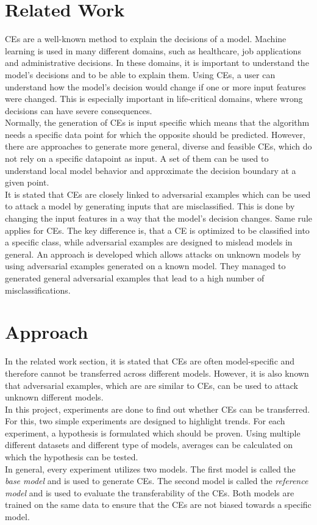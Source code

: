 \documentclass{article}
\begin{document}
\section{Related Work}
CEs are a well-known method to explain the decisions of a model. Machine learning is used in many different domains, such as healthcare, job applications and administrative decisions. In these domains, it is important to understand the model's decisions and to be able to explain them. Using CEs, a user can understand how the model's decision would change if one or more input features were changed. This is especially important in life-critical domains, where wrong decisions can have severe consequences. \cite{examples_cf_applications}\\
Normally, the generation of CEs is input specific which means that the algorithm needs a specific data point for which the opposite should be predicted. However, there are approaches to generate more general, diverse and feasible CEs, which do not rely on a specific datapoint as input. A set of them can be used to understand local model behavior and approximate the decision boundary at a given point. \cite{examples_cf_applications} \\
It is stated that CEs are closely linked to adversarial examples which can be used to attack a model by generating inputs that are misclassified. This is done by changing the input features in a way that the model's decision changes. Same rule applies for CEs. The key difference is, that a CE is optimized to be classified into a specific class, while adversarial examples are designed to mislead models in general. An approach is developed which allows attacks on unknown models by using adversarial examples generated on a known model. They managed to generated general adversarial examples that lead to a high number of misclassifications. \cite{papernot2016transferabilitymachinelearningphenomena} \\

\section{Approach}
In the related work section, it is stated that CEs are often model-specific and therefore cannot be transferred across different models. However, it is also known that adversarial examples, which are are similar to CEs, can be used to attack unknown different models.\\
In this project, experiments are done to find out whether CEs can be transferred. For this, two simple experiments are designed to highlight trends. For each experiment, a hypothesis is formulated which should be proven. Using multiple different datasets and different type of models, averages can be calculated on which the hypothesis can be tested.\\
In general, every experiment utilizes two models. The first model is called the \textit{base model} and is used to generate CEs. The second model is called the \textit{reference model} and is used to evaluate the transferability of the CEs. Both models are trained on the same data to ensure that the CEs are not biased towards a specific model.\\
\end{document}

